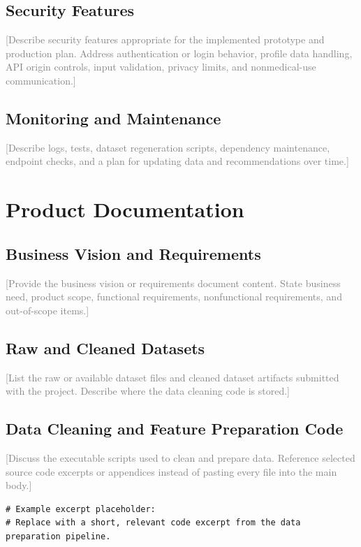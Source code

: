 \documentclass[12pt]{report}
\newcommand{\placeholder}[1]{\textcolor{gray}{[#1]}}
\begin{document}
\section{Security Features}
\placeholder{Describe security features appropriate for the implemented prototype and production plan. Address authentication or login behavior, profile data handling, API origin controls, input validation, privacy limits, and nonmedical-use communication.}

\section{Monitoring and Maintenance}
\placeholder{Describe logs, tests, dataset regeneration scripts, dependency maintenance, endpoint checks, and a plan for updating data and recommendations over time.}

\chapter{Product Documentation}

\section{Business Vision and Requirements}
\placeholder{Provide the business vision or requirements document content. State business need, product scope, functional requirements, nonfunctional requirements, and out-of-scope items.}

\section{Raw and Cleaned Datasets}
\placeholder{List the raw or available dataset files and cleaned dataset artifacts submitted with the project. Describe where the data cleaning code is stored.}

\section{Data Cleaning and Feature Preparation Code}
\placeholder{Discuss the executable scripts used to clean and prepare data. Reference selected source code excerpts or appendices instead of pasting every file into the main body.}

\begin{verbatim}
# Example excerpt placeholder:
# Replace with a short, relevant code excerpt from the data preparation pipeline.
\end{verbatim}
\end{document}
